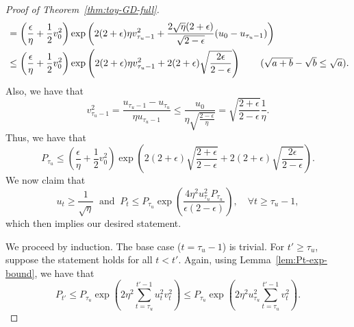 \begin{proof}[Proof of Theorem~\ref{thm:toy-GD-full}]
\begin{align*}
        &= \left( \frac{\epsilon}{\eta} + \frac{1}{2} v_0^2 \right) \exp\left( 2(2 + \epsilon)\eta v_{\tau_u - 1}^2 + \frac{2 \sqrt{\eta} (2 + \epsilon)}{\sqrt{2 - \epsilon}} (u_0 - u_{\tau_u - 1}) \right) \\
        &\leq \left( \frac{\epsilon}{\eta} + \frac{1}{2} v_0^2 \right) \exp\left( 2(2 + \epsilon)\eta v_{\tau_u - 1}^2 + 2(2 + \epsilon) \sqrt{\frac{2\epsilon}{2 - \epsilon}} \right) \tag{$\sqrt{a + b} - \sqrt{b} \leq \sqrt{a}$}.
    \end{align*}
    Also, we have that
    \begin{equation}
    \label{eqn:v-tau}
        v_{\tau_u - 1}^2 = \frac{u_{\tau_u - 1} - u_{\tau_u}}{\eta u_{\tau_u - 1}}
        \leq \frac{u_0}{\eta \sqrt{\frac{2 - \epsilon}{\eta}}}
        = \sqrt{\frac{2 + \epsilon}{2 - \epsilon}} \frac{1}{\eta}.
    \end{equation}
    Thus, we have that
    \begin{equation}
    \label{eqn:P-tau}
        P_{\tau_u} \leq \left( \frac{\epsilon}{\eta} + \frac{1}{2} v_0^2 \right) \exp\left( 2(2 + \epsilon) \sqrt{\frac{2 + \epsilon}{2 - \epsilon}} + 2(2 + \epsilon) \sqrt{\frac{2\epsilon}{2 - \epsilon}} \right).
    \end{equation}
    We now claim that
    \begin{equation}
        u_t \geq \frac{1}{\sqrt \eta} \ \text{ and } \ P_t \leq P_{\tau_u} \exp\left( \frac{4\eta^2 u_{\tau_u}^2 P_{\tau_u}}{\epsilon(2 - \epsilon)} \right), \quad \forall t \geq \tau_u - 1,
    \end{equation}
    which then implies our desired statement.

    We proceed by induction.
    The base case ($t = \tau_u - 1$) is trivial.
    For $t' \geq \tau_u$, suppose the statement holds for all $t < t'$.
    Again, using Lemma~\ref{lem:Pt-exp-bound}, we have that
    \begin{equation*}
        P_{t'} \leq P_{\tau_u} \exp\left( 2\eta^2 \sum_{t=\tau_u}^{t' - 1} u_t^2 v_t^2 \right)
        \leq P_{\tau_u} \exp\left( 2\eta^2 u_{\tau_u}^2 \sum_{t=\tau_u}^{t' - 1} v_t^2 \right).
    \end{equation*}
    

\end{proof}
